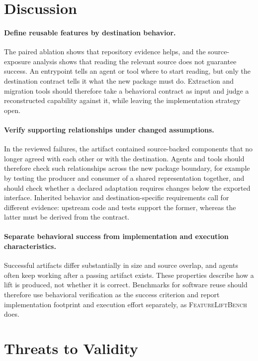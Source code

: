 \documentclass[acmsmall,screen,review,anonymous]{acmart}
\newcommand{\flb}{\textsc{FeatureLiftBench}\xspace}
\begin{document}
\FloatBarrier
\section{Discussion}
\label{sec:discussion}

\paragraph{Define reusable features by destination behavior.}
The paired ablation shows that repository evidence helps, and the
source-exposure analysis shows that reading the relevant source does not
guarantee success. An entrypoint tells an agent or tool where to start reading,
but only the destination contract tells it what the new package must do.
Extraction and migration tools should therefore take a behavioral contract as
input and judge a reconstructed capability against it, while leaving the
implementation strategy open.

\paragraph{Verify supporting relationships under changed assumptions.}
In the reviewed failures, the artifact contained source-backed components that
no longer agreed with each other or with the destination. Agents and tools
should therefore check such relationships across the new package boundary, for
example by testing the producer and consumer of a shared representation
together, and should check whether a declared adaptation requires changes below
the exported interface. Inherited behavior and destination-specific requirements
call for different evidence: upstream code and tests support the former,
whereas the latter must be derived from the contract.

\paragraph{Separate behavioral success from implementation and execution characteristics.}
Successful artifacts differ substantially in size and source overlap, and
agents often keep working after a passing artifact exists. These properties
describe how a lift is produced, not whether it is correct. Benchmarks for
software reuse should therefore use behavioral verification as the success
criterion and report implementation footprint and execution effort separately,
as \flb does.

\section{Threats to Validity}
\label{sec:threats}
\end{document}
